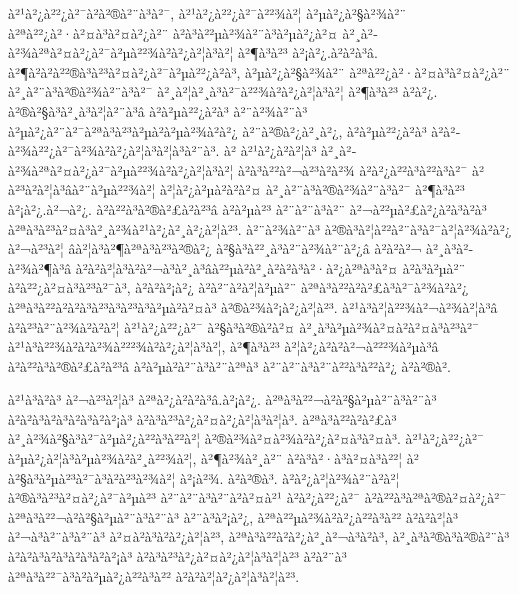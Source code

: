 à²¹à²¿à²²¿à²¯à²\circ à²®à²¨à³à²¯, à²¹à²¿à²²¿à²¯à²²¾à²¦ à²µà²¿à²§à²¾à²¨ à²ªà²²¿à²·à²¤à³à²¤à²¿à²¨ à²à³à²²µà²¾à²¨à³à²µà²¿à²¤ à²¸à²­à²¾à²ªà²¤à²¿à²¯à²µà²²¾à²à²¿à²¦à³à²¦ à²¶à³à²³ à²¡à²¿.à²à²à³â. à²¶à²à²à²²®à³à²³à²¤à²¿à²¯à²µà²²¿à²à³, à²µà²¿à²§à²¾à²¨ à²ªà²²¿à²·à²¤à³à²¤à²¿à²¨ à²¸à²¨à³à²®à²¾à²¨à³à²¯ à²¸à²¦à²¸à³à²¯à²²¾à²à²¿à²¦à³à²¦ à²¶à³à²³ à²à²¿. à²®à²§à³à²¸à³à²¦à²¨à³â à²à²µà²²¿à²à³ à²¨à²¾à²¨à³ à²µà²¿à²¨à²¯à²ªà³à²³à²µà²à²µà²¾à²à²¿ à²¨à²®à²¿à²¸à²¿, à²à²µà²²¿à²à³ à²à²­à²¾à²²¿à²¯à²¾à²à²¿à²¦à³à²¦à³à²¨à³. à² à²¹à²¿à²à²¦à³ à²¸à²­à²¾à²ªà²¤à²¿à²¯à²µà²²¾à²à²¿à²¦à³à²¦ à²à³à²²à²¬à²³à²à²¾ à²à²¿à²²à³à²²à³à²¯ à²à²³à²à²¦à³âà²¨à²µà²²¾à²¦ à²¦à²¿à²µà²à²à²¤ à²¸à²¨à³à²®à²¾à²¨à³à²¯ à²¶à³à²³ à²¡à²¿.à²¬à²¿. à²à²²à³à²®à²£à²à²³â à²à²µà²³ à²¨à²¨à³à²¨ à²¬à²²µà²£à²¿à²à³à²à³ à²ªà³à²³à²¤à³à²¸à²¾à²¹à²¿à²¸à²¿à²¦à²³. à²¨à²¾à²¨à³ à²®à³à²¦à²²à²¨à³à²¯à²¦à²¾à²à²¿ à²¬à²³à²¦ âà²¦à³à²¶à²ªà³à²³à²®à²¿ à²§à³à²²¸à³à²¨à²¾à²¨à²¿â à²à²à²¬ à²¸à³à²­à²¾à²¶à³â à²à²à²¦à³à²\circ à²¬à³à²¸à³âà²²µà²\circ à²¸à²à²à³à²·à²¿à²ªà³à²¤ à²à³à²µà²¨ à²à²²¿à²¤à³à²³à²¯à³, à²à²à²¡à²¿ à²à²¨à²à²¦à²µà²¨ à²ªà³à²²à²à²£à³à²¯à²¾à²à²¿ à²ªà³à²²à²à²à³à²³à³à²³à³à²µà²à²¤à³ à²®à²¾à²¡à²¿à²¦à²³. à²¹à³à²¦à²²¾à²¬à²¾à²¦à³â à²à²³à²¨à²¾à²à²à²¦ à²¹à²¿à²²¿à²¯ à²§à³à²®à²à²¤ à²¸à³à²µà²¾à²¤à²à²¤à³à²³à²¯ à²¹à³à²²¾à²à²à²¾à²²²¾à²à²¿à²¦à³à²¦, à²¶à³à²³ à²¦à²¿à²à²à²¬à²²²¾à²µà³â à²à²²à³à²®à²£à²à²³â à²à²µà²\circ à²¨à³à²¨à²ªà³ à²¨à²¨à³à²¨à²²à³à²²à²¿ à²à²®à²\circ.

à²¹à³à²à³ à²¬à²³à²¦à³ à²ªà²¿à²à²à³â.à²¡à²¿. à²ªà³à²²¬à²à²§à²µà²¨à³à²¨à³ à²à²à³à²à³à²à³à²à²¡à³ à²à³à²³à²¿à²¤à²¿à²¦à³à²¦à³. à²ªà³à²²à²à²£à³ à²¸à²¾à²§à³à²¯à²µà²¿à²²à³à²²à²¦ à²®à²¾à²¤à²¾à²à²¿à²¤à³à²¤à³. à²¹à²¿à²²¿à²¯ à²µà²¿à²¦à³à²µà²¾à²à²¸à²²¾à²¦, à²¶à²¾à²¸à²¨ à²à³à²·à³à²¤à³à²²¦ à²à²§à³à²µà²³à²¯à³à²à²³à²¾à²¦ à²¡à²¾. à²à²®à³. à²à²¿à²¦à²¾à²¨à²à²¦ à²®à³à²³à²¤à²¿à²¯à²µà²³ à²¨à²¨à³à²¨à²à²¤à²¹ à²à²¿à²²¿à²¯ à²à²²à³à²ªà²®à²¤à²¿à²¯ à²ªà³à²²¬à²à²§à²µà²¨à³à²¨à³ à²¨à³à²¡à²¿, à²ªà²²µà²¾à²à²¿à²²à³à²² à²à²à²¦à³ à²¬à³à²¨à³à²¨à³ à²¤à²à³à²à²¿à²¦à²³, à²ªà³à²²à²à²¿à²¸à²¬à³à²à³, à²¸à³à²®à³à²®à²¨à³ à²à²à³à²à³à²à³à²à²¡à³ à²à³à²³à²¿à²¤à²¿à²¦à³à²¦à²³ à²à²¨à³ à²ªà³à²²¯à³à²à²µà²¿à²²à³à²² à²à²à²¦à²¿à²¦à³à²¦à²³. 

